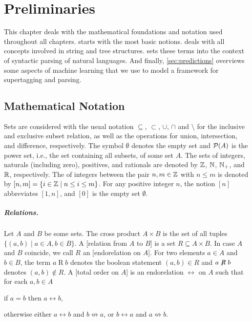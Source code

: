 \documentclass[../document.tex]{subfiles}
\begin{document}
    \chapter{Preliminaries}\label{sec:preliminaries}
    This chapter deals with the mathematical foundations and notation used throughout all chapters.
     starts with the most basic notions.
     deals with all concepts involved in string and tree structures.
     sets these terms into the context of syntactic parsing of natural languages.
    And finally, \cref{sec:predictions} overviews some aspects of machine learning that we use to model a framework for supertagging and parsing.

    \section{Mathematical Notation}\label{sec:preliminaries:math}
    Sets are considered with the usual notation \(\subseteq\), \(\subset\), \(\cup\), \(\cap\) and \(\setminus\) for the inclusive and exclusive subset relation, as well as the operations for union, intersection, and difference, respectively.
    The symbol \(\emptyset\) denotes the empty set and \(\mathcal{P}(A)\) is the power set, i.e., the set containing all subsets, of some set \(A\).
    The sets of integers, naturals (including zero), positives, and rationals are denoted by $\mathbb{Z}$, $\mathbb{N}$, $\mathbb{N}_+$, and $\mathbb{R}$, respectively.
    The  of integers between the pair \(n, m \in \mathbb{Z}\) with \(n \leq m\) is denoted by \([n,m] = \{i \in \mathbb{Z} \mid n \leq i \leq m\}\).
    For any positive integer \(n\), the notion \([n]\) abbreviates \([1,n]\), and \([0]\) is the empty set \(\emptyset\).

    \paragraph{Relations.}
    Let \(A\) and \(B\) be some sets.
    The cross product \(A \times B\) is the set of all tuples \(\{(a,b) \mid a \in A, b\in B\}\).
    A [relation from \(A\) to \(B\)] is a set \(R \subseteq A \times B\).
    In case \(A\) and \(B\) coincide, we call \(R\) an [endorelation on \(A\)].
    For two elements \(a \in A\) and \(b \in B\), the term \(a \mathrel{R} b\) denotes the boolean statement \((a,b) \in R\) and \(a \not\mathrel{R} b\) denotes \((a,b) \notin R\).
    A [total order on \(A\)] is an endorelation \(\rel\) on \(A\) such that for each \(a, b \in A\)
    \begin{inparaenum}
        \item if \(a = b\) then \(a \rel b\),
        \item otherwise either \(a \rel b\) and \(b \not\rel a\), or \(b \rel a\) and \(a \not\rel b\).
    \end{inparaenum}
\end{document}

